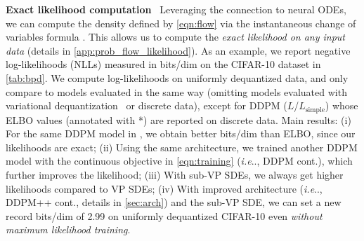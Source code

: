 \documentclass{article} \usepackage{iclr2021_conference,times}
\makeatletter
\def\@onedot{\ifx\@let@token.\else.\null\fi\xspace}
\DeclareRobustCommand\onedot{\futurelet\@let@token\@onedot}
\def\ie{\emph{i.e}\onedot}
\makeatother
\begin{document}
\textbf{Exact likelihood computation}~ Leveraging the connection to neural ODEs, we can compute the density defined by \cref{eqn:flow}  via the instantaneous change of variables formula \citep{chen2018neural}. This allows us to compute the \emph{exact likelihood on any input data} (details in \cref{app:prob_flow_likelihood}). As an example, we report negative log-likelihoods (NLLs) measured in bits/dim on the CIFAR-10 dataset in \cref{tab:bpd}. We compute log-likelihoods on uniformly dequantized data, and only compare to models evaluated in the same way (omitting models evaluated with variational dequantization~\citep{ho2019flow++} or discrete data), except for DDPM ($L$/$L_\text{simple}$) whose ELBO values (annotated with *) are reported on discrete data. Main results: (i) For the same DDPM model in \citet{ho2020denoising}, we obtain better bits/dim than ELBO, since our likelihoods are exact; (ii) Using the same architecture, we trained another DDPM model with the continuous objective in \cref{eqn:training} (\ie, DDPM cont.), which further improves the likelihood; (iii) With sub-VP SDEs, we always get higher likelihoods compared to VP SDEs; (iv) With improved architecture (\ie, DDPM++ cont., details in \cref{sec:arch}) and the sub-VP SDE, we can set a new record bits/dim of 2.99 on uniformly dequantized CIFAR-10 even \emph{without maximum likelihood training}.
\end{document}
